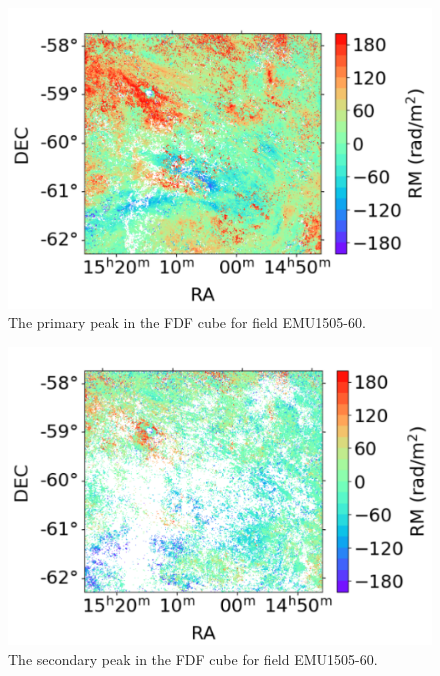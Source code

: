 \begin{figure}
    \centering
    \includegraphics[width=\linewidth]{Thesis_Template/Figures/Peak 1.png}
    \caption{The primary peak in the FDF cube for field EMU1505-60.}
    \label{fig: peak 1}
\end{figure}


\begin{figure}
    \centering
    \includegraphics[width=\linewidth]{Thesis_Template/Figures/Peak 2.png}
    \caption{The secondary peak in the FDF cube for field EMU1505-60.}
    \label{fig: peak 2}
\end{figure}

